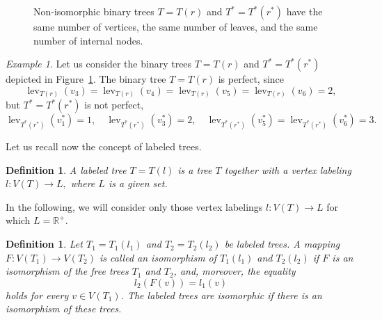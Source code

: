 \documentclass{raex}
\newtheorem{defn}[thm]{Definition}
\theoremstyle{definition}
\theoremstyle{remark}
\numberwithin{equation}{section}
\newtheorem{example}[thm]{Example}
\begin{document}
\begin{figure}[h]
\begin{minipage}[t]{0.46\textwidth}
\end{minipage}

\caption{Non-isomorphic binary  trees $T=T(r)$ and $T^*=T^{*}(r^{*})$ have the same number of vertices,
the same number of leaves, and the same number of internal nodes.\label{fig1}}
\end{figure}







\begin{example}
Let us consider the binary  trees $T=T(r)$ and $T^*=T^*(r^{*})$ depicted in Figure~\ref{fig1}. 
The binary tree $T = T(r)$ is
perfect, since
\[
\operatorname{lev}_{T(r)}(v_3)
=
\operatorname{lev}_{T(r)}(v_4)
=
\operatorname{lev}_{T(r)}(v_5)
=
\operatorname{lev}_{T(r)}(v_6)
=
2,
\]
but $T^* = T^*(r^*)$ is not perfect,
\[
\operatorname{lev}_{T^*(r^*)}(v_1^*) = 1, \quad
\operatorname{lev}_{T^*(r^*)}(v_3^*) = 2,
\quad 
\operatorname{lev}_{T^*(r^*)}(v_5^*)
=
\operatorname{lev}_{T^*(r^*)}(v_6^*)
= 3.
\]
\end{example}



Let us recall now the concept of  labeled  trees.

\begin{defn}\label{rvjiu}
A labeled tree $T=T(l)$ is a tree $T$
together with a vertex labeling
\(
l:V(T)\to L,
\)
where \(L\) is a given set.
\end{defn}

In the following, we will consider only those vertex labelings $l:V(T)\to L$ for which $L=\mathbb{R}^+$.





\begin{defn}\label{poogf}
Let $T_1=T_1(l_1)$ and $T_2=T_2(l_2)$ be labeled trees.
A mapping $F:V(T_1)\to V(T_2)$  is called an isomorphism of 
$T_1(l_1)$ and $T_2(l_2)$ if 
$F$ is an isomorphism 
of the free trees
$T_1$ and $T_2$, and, moreover,
the equality
\begin{equation*}
l_2(F(v))=l_1(v)
\end{equation*}
holds for every $v\in V(T_1)$. The labeled  trees
 are isomorphic if there is an
isomorphism of these trees.
\end{defn}
\end{document}
